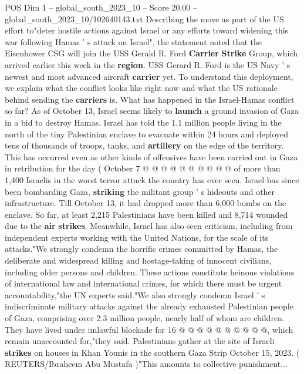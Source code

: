 \begin{textsample}{POS Dim 1 – global\_south\_2023\_10 – Score 20.00 – global\_south\_2023\_10/102640143.txt}  \label{ex:f1_pos_059}
Describing the move as part of the US effort to"deter hostile actions against Israel or any efforts toward widening this war following Hamas ' s attack on Israel", the statement noted that the Eisenhower CSG will join the USS Gerald R.
Ford \textbf{Carrier} \textbf{Strike} Group, which arrived earlier this week in the \textbf{region}.
USS Gerard R.
Ford is the US Navy ' s newest and most advanced aircraft \textbf{carrier} yet.
To understand this deployment, we explain what the conflict looks like right now and what the US rationale behind sending the \textbf{carriers} is.
What has happened in the Israel-Hamas conflict so far?
As of October 13, Israel seems likely to \textbf{launch} a ground invasion of Gaza in a bid to destroy Hamas.
Israel has told the 1.1 million people living in the north of the tiny Palestinian enclave to evacuate within 24 hours and deployed tens of thousands of troops, tanks, and \textbf{artillery} on the edge of the territory.
This has occurred even as other kinds of offensives have been carried out in Gaza in retribution for the day ( October 7 @ @ @ @ @ @ @ @ @ @ of more than 1,400 Israelis in the worst terror attack the country has ever seen.
Israel has since been bombarding Gaza, \textbf{striking} the militant group ' s hideouts and other infrastructure.
Till October 13, it had dropped more than 6,000 bombs on the enclave.
So far, at least 2,215 Palestinians have been killed and 8,714 wounded due to the \textbf{air} \textbf{strikes}.
Meanwhile, Israel has also seen criticism, including from independent experts working with the United Nations, for the scale of its attacks."We strongly condemn the horrific crimes committed by Hamas, the deliberate and widespread killing and hostage-taking of innocent civilians, including older persons and children.
These actions constitute heinous violations of international law and international crimes, for which there must be urgent accountability,"the UN experts said."We also strongly condemn Israel ' s indiscriminate military attacks against the already exhausted Palestinian people of Gaza, comprising over 2.3 million people, nearly half of whom are children.
They have lived under unlawful blockade for 16 @ @ @ @ @ @ @ @ @ @, which remain unaccounted for,"they said.
Palestinians gather at the site of Israeli \textbf{strikes} on houses in Khan Younis in the southern Gaza Strip October 15, 2023. ( REUTERS/Ibraheem Abu Mustafa )"This amounts to collective punishment...

\end{textsample}
